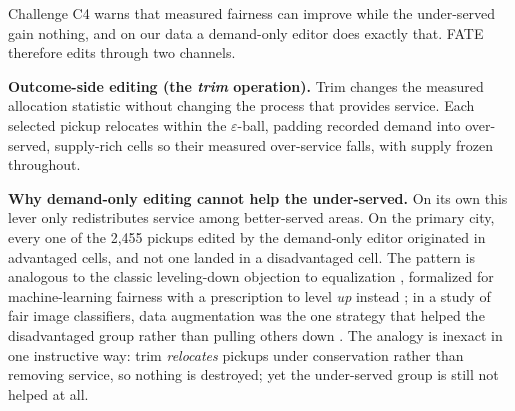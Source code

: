 Challenge C4 warns that measured fairness can improve while the under-served
gain nothing, and on our data a demand-only editor does exactly that. FATE
therefore edits through two channels.

\textbf{Outcome-side editing (the \emph{trim} operation).} Trim changes the
measured allocation statistic without changing the process that provides
service. Each selected pickup relocates within the $\varepsilon$-ball,
padding recorded demand into over-served, supply-rich cells so their measured
over-service falls, with supply frozen throughout.

\textbf{Why demand-only editing cannot help the
under-served.}\label{sec:leveling} On its own this lever only redistributes
service among better-served areas. On the primary city, every one of the
2{,}455 pickups edited by the demand-only editor originated in advantaged
cells, and not one landed in a disadvantaged cell.
The pattern is analogous to the classic leveling-down objection to
equalization \cite{parfit1997}, formalized for machine-learning fairness with
a prescription to level \emph{up} instead \cite{mittelstadt2024}; in a study
of fair image classifiers, data augmentation was the one strategy that helped
the disadvantaged group rather than pulling others down \cite{zietlow2022}.
The analogy is inexact in one
instructive way: trim \emph{relocates} pickups under conservation rather than
removing service, so nothing is destroyed; yet the under-served group is still
not helped at all.

